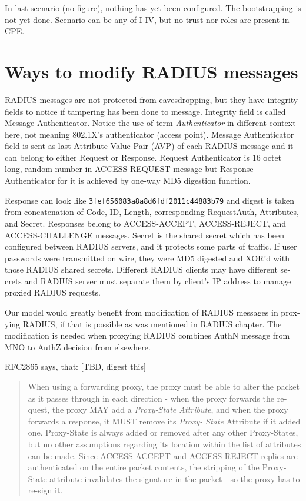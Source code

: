 \documentclass[12pt,a4paper,english]{tutthesis}
\begin{document}
\begin{otherlanguage}{english}
In last scenario (no figure), nothing has yet been configured. The bootstrapping
is not yet done. Scenario can be any of I-IV, but 
no trust nor roles are present in CPE.
\section{Ways to modify RADIUS messages}
\label{sec-4-6}
RADIUS messages are not protected from eavesdropping, but they have
integrity fields to notice if tampering has been done to message.  
Integrity field is called Message Authenticator.
Notice the use of term \emph{Authenticator} in different context here, not
meaning 802.1X's authenticator (access point).
Message Authenticator field is sent as last Attribute Value Pair (AVP)
of each RADIUS message and it can belong 
to either Request or Response.\cite[p.20]{radiusbook}
Request Authenticator is 16 octet long, random number in
ACCESS-REQUEST message but Response Authenticator for it is achieved
by one-way MD5 digestion function. 

Response can look like \texttt{3fef656083a8a8d6fdf2011c44883b79} and digest
is taken from concatenation of Code, ID, Length, corresponding
Request\-Auth, Attributes, and Secret. Responses belong to
ACCESS-ACCEPT, ACCESS-REJECT, and ACCESS-CHALLENGE messages.  Secret
is the shared secret which has been configured between RADIUS servers,
and it protects some parts of traffic. If user passwords were
transmitted on wire, they were MD5 digested and XOR'd with those
RADIUS shared secrets.  Different RADIUS clients may have different
secrets and RADIUS server must separate them by client's IP address to
manage proxied RADIUS requests.\cite{radiusbook}


Our model would greatly benefit from modification of RADIUS messages in proxying
RADIUS, if that is possible as was mentioned in RADIUS chapter.
The modification is needed when proxying RADIUS combines AuthN message
from MNO to AuthZ decision from elsewhere.


RFC2865 says, that: [TBD, digest this]
\begin{quote}
When using a forwarding proxy, the proxy must be able to alter the
      packet as it passes through in each direction - when the proxy
      forwards the request, the proxy MAY add a \emph{Proxy-State
      Attribute}, and when the proxy forwards a response, it MUST
      remove its \emph{Proxy- State} Attribute if it added one.
      Proxy-State is always added or removed after any other
      Proxy-States, but no other assumptions regarding its location
      within the list of attributes can be made.  Since ACCESS-ACCEPT
      and ACCESS-REJECT replies are authenticated on the entire packet
      contents, the stripping of the Proxy-State attribute invalidates
      the signature in the packet - so the proxy has to re-sign it.


\end{quote}
\end{otherlanguage}
\end{document}
